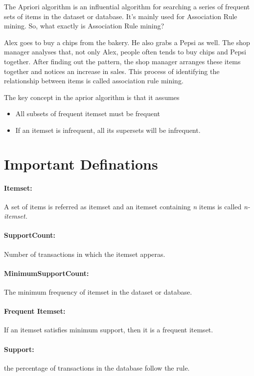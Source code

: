 \documentclass{book}
\begin{document}
    The Apriori algorithm is an influential algorithm for searching a series of frequent sets of items in the dataset or database. It's mainly used for Association Rule mining. So, what exactly is Association Rule mining?

Alex goes to buy a chips from the bakery. He also grabs a Pepsi as well. The shop manager analyses that, not only Alex, people often tends to buy chips and Pepsi together. After finding out the pattern, the shop manager arranges these items together and notices an increase in sales. This process of identifying the relationship between items is called association rule mining.

The key concept in the aprior algorithm is that it assumes

\begin{itemize}
    \item All subsets of frequent itemset must be frequent
    \item If an itemset is infrequent, all its supersets will be infrequent.
\end{itemize}

\section*{Important Definations}

\paragraph{Itemset:} A set of items is referred as itemset and an itemset containing \emph{n} items is called \emph{n-itemset.}
\paragraph{SupportCount:} Number of transactions in  which the itemset apperas.
\paragraph{MinimumSupportCount:} The minimum frequency of itemset in the dataset or database.
\paragraph{Frequent Itemset:} If an itemset satisfies minimum support, then it is a frequent itemset.
\paragraph{Support:} the percentage of transactions in the database follow the rule.
\end{document}
